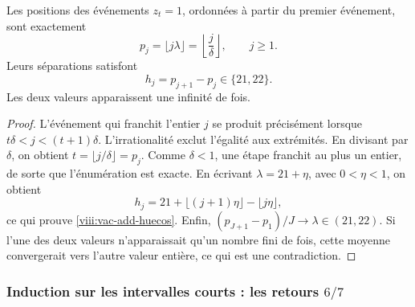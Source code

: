\begin{theorem}
\label{viii:vac-add-teorema-primario}
Les positions des événements \(z_t=1\), ordonnées à partir du premier événement, sont exactement
\begin{equation}
 p_j=\lfloor j\lambda\rfloor
     =\left\lfloor\frac j\delta\right\rfloor,
 \qquad j\geq1.
 \label{viii:vac-add-posiciones}
\end{equation}
Leurs séparations satisfont
\begin{equation}
 h_j=p_{j+1}-p_j\in\{21,22\}.
 \label{viii:vac-add-huecos}
\end{equation}
Les deux valeurs apparaissent une infinité de fois.
\end{theorem}
\begin{proof}
L'événement qui franchit l'entier \(j\) se produit précisément lorsque
\(t\delta<j<(t+1)\delta\). L'irrationalité exclut l'égalité aux
extrémités. En divisant par \(\delta\), on obtient
\(t=\lfloor j/\delta\rfloor=p_j\). Comme \(\delta<1\), une étape
franchit au plus un entier, de sorte que l'énumération est exacte.
En écrivant \(\lambda=21+\eta\), avec \(0<\eta<1\), on obtient
\[
 h_j=21+\lfloor(j+1)\eta\rfloor-\lfloor j\eta\rfloor,
\]
ce qui prouve \eqref{viii:vac-add-huecos}. Enfin, \((p_{J+1}-p_1)/J\to\lambda\in(21,22)\). Si l'une des deux valeurs n'apparaissait qu'un nombre fini de fois, cette moyenne convergerait vers l'autre valeur entière, ce qui est une contradiction.
\end{proof}

\subsubsection{Induction sur les intervalles courts : les retours \(6/7\)}
\label{viii:vac-add-secundarios}

